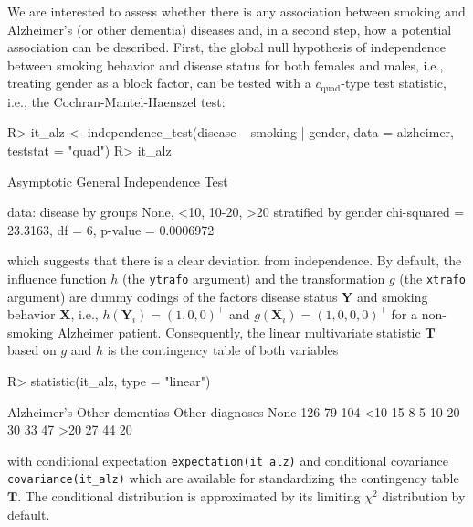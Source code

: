 \documentclass{article}
\newcommand{\Rcmd}[1]{\texttt{#1}}
\newcommand{\X}{\mathbf{X}}
\newcommand{\Y}{\mathbf{Y}}
\newcommand{\T}{\mathbf{T}}
\newenvironment{Schunk}{}{}
\begin{document}
We are interested to assess whether there is any association
between smoking and Alzheimer's (or other dementia) diseases and, in a
second step, how a potential association can be described. First,
the global null hypothesis of independence between smoking behavior and disease
status for both females and males, i.e., treating gender as a
block factor, can be tested with a $c_\text{quad}$-type test statistic, i.e., the 
Cochran-Mantel-Haenszel test:
\begin{Schunk}
\begin{Sinput}
R> it_alz <- independence_test(disease ~ smoking | gender, 
       data = alzheimer, teststat = "quad")
R> it_alz
\end{Sinput}
\begin{Soutput}
	Asymptotic General Independence Test

data:  disease by
	 groups None, <10, 10-20, >20 
	 stratified by gender 
chi-squared = 23.3163, df = 6, p-value = 0.0006972
\end{Soutput}
\end{Schunk}
which suggests that there is a clear deviation from independence. 
By default, the influence function $h$ (the \Rcmd{ytrafo} argument)
and the transformation $g$ (the \Rcmd{xtrafo} argument)
are dummy codings of the factors disease status $\Y$ and smoking behavior $\X$, 
i.e., $h(\Y_i) = (1, 0, 0)^\top$ 
and $g(\X_i) = (1, 0, 0 ,0)^\top$ for a non-smoking Alzheimer patient. 
Consequently, the linear multivariate statistic $\T$ based on $g$ and $h$ 
is the contingency table of both variables 
\begin{Schunk}
\begin{Sinput}
R> statistic(it_alz, type = "linear")
\end{Sinput}
\begin{Soutput}
      Alzheimer's Other dementias Other diagnoses
None          126              79             104
<10            15               8               5
10-20          30              33              47
>20            27              44              20
\end{Soutput}
\end{Schunk}
with conditional expectation \Rcmd{expectation(it\_alz)} and conditional
covariance \Rcmd{covariance(it\_alz)} which are available for standardizing
the contingency table $\T$. The conditional distribution is approximated by
its limiting $\chi^2$ distribution by default. 
\end{document}
